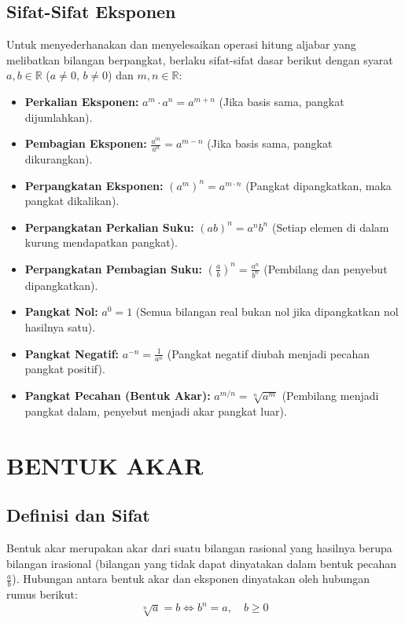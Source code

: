 \documentclass[12pt, a4paper]{article}
\begin{document}
\subsection{Sifat-Sifat Eksponen}
Untuk menyederhanakan dan menyelesaikan operasi hitung aljabar yang melibatkan bilangan berpangkat, berlaku sifat-sifat dasar berikut dengan syarat $a, b \in \mathbb{R}$ ($a \neq 0,\, b \neq 0$) dan $m, n \in \mathbb{R}$:
\begin{itemize}
    \item \textbf{Perkalian Eksponen:} $a^m \cdot a^n = a^{m+n}$ (Jika basis sama, pangkat dijumlahkan).
    \item \textbf{Pembagian Eksponen:} $\frac{a^m}{a^n} = a^{m-n}$ (Jika basis sama, pangkat dikurangkan).
    \item \textbf{Perpangkatan Eksponen:} $(a^m)^n = a^{m \cdot n}$ (Pangkat dipangkatkan, maka pangkat dikalikan).
    \item \textbf{Perpangkatan Perkalian Suku:} $(ab)^n = a^n b^n$ (Setiap elemen di dalam kurung mendapatkan pangkat).
    \item \textbf{Perpangkatan Pembagian Suku:} $\left(\frac{a}{b}\right)^n = \frac{a^n}{b^n}$ (Pembilang dan penyebut dipangkatkan).
    \item \textbf{Pangkat Nol:} $a^0 = 1$ (Semua bilangan real bukan nol jika dipangkatkan nol hasilnya satu).
    \item \textbf{Pangkat Negatif:} $a^{-n} = \frac{1}{a^n}$ (Pangkat negatif diubah menjadi pecahan pangkat positif).
    \item \textbf{Pangkat Pecahan (Bentuk Akar):} $a^{m/n} = \sqrt[n]{a^m}$ (Pembilang menjadi pangkat dalam, penyebut menjadi akar pangkat luar).
\end{itemize}

\section{BENTUK AKAR}

\subsection{Definisi dan Sifat}
Bentuk akar merupakan akar dari suatu bilangan rasional yang hasilnya berupa bilangan irasional (bilangan yang tidak dapat dinyatakan dalam bentuk pecahan $\frac{a}{b}$). Hubungan antara bentuk akar dan eksponen dinyatakan oleh hubungan rumus berikut:
\[ \sqrt[n]{a} = b \iff b^n = a, \quad b \geq 0 \] 
\end{document}
